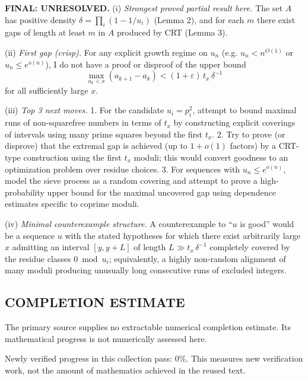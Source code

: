 \medskip
\noindent\textbf{FINAL: \textbf{UNRESOLVED}.}
(i) \emph{Strongest proved partial result here.} The set $A$ has positive density $\delta=\prod_i(1-1/u_i)$ (Lemma 2), and for each $m$ there exist gaps of length at least $m$ in $A$ produced by CRT (Lemma 3).

(ii) \emph{First gap (crisp).} For any explicit growth regime on $u_n$ (e.g. $u_n<n^{O(1)}$ or $u_n\le e^{o(n)}$), I do not have a proof or disproof of the upper bound
\[\max_{a_k<x}(a_{k+1}-a_k) < (1+\varepsilon)\,t_x\,\delta^{-1}\]
for all sufficiently large $x$.

(iii) \emph{Top 3 next moves.}
1. For the candidate $u_i=p_i^2$, attempt to bound maximal runs of non-squarefree numbers in terms of $t_x$ by constructing explicit coverings of intervals using many prime squares beyond the first $t_x$.
2. Try to prove (or disprove) that the extremal gap is achieved (up to $1+o(1)$ factors) by a CRT-type construction using the first $t_x$ moduli; this would convert goodness to an optimization problem over residue choices.
3. For sequences with $u_n\le e^{o(n)}$, model the sieve process as a random covering and attempt to prove a high-probability upper bound for the maximal uncovered gap using dependence estimates specific to coprime moduli.

(iv) \emph{Minimal counterexample structure.} A counterexample to ``$u$ is good'' would be a sequence $u$ with the stated hypotheses for which there exist arbitrarily large $x$ admitting an interval $[y,y+L]$ of length $L\gg t_x\,\delta^{-1}$ completely covered by the residue classes $0\bmod u_i$; equivalently, a highly non-random alignment of many moduli producing unusually long consecutive runs of excluded integers.




\subsection*{COMPLETION ESTIMATE}
The primary source supplies no extractable numerical completion estimate. Its mathematical progress is not numerically assessed here.

Newly verified progress in this collection pass: $0\%$. This measures new verification work, not the amount of mathematics achieved in the reused text.
